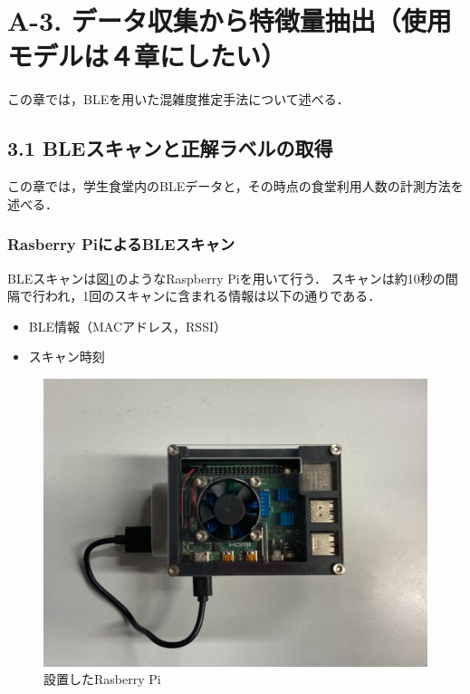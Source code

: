 \section*{A-3. データ収集から特徴量抽出（使用モデルは４章にしたい）}
この章では，BLEを用いた混雑度推定手法について述べる．

\subsection*{3.1 BLEスキャンと正解ラベルの取得}
この章では，学生食堂内のBLEデータと，その時点の食堂利用人数の計測方法を述べる．

\subsubsection*{Rasberry PiによるBLEスキャン}
BLEスキャンは図\ref{raspi}のようなRaspberry Piを用いて行う．
スキャンは約10秒の間隔で行われ，1回のスキャンに含まれる情報は以下の通りである．
\begin{itemize}
  \item BLE情報（MACアドレス，RSSI）
  \item スキャン時刻
\end{itemize}

\begin{figure}[pt]
  \includegraphics[scale=0.07]{./images/raspi.jpg}
  \centering
  \caption{設置したRasberry Pi\label{raspi}}
\end{figure}

